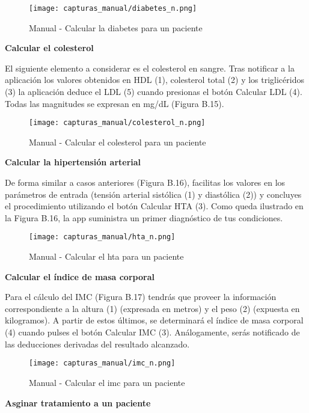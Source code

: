 \documentclass[11pt,spanish,
		listoftables,listoffigures]
		{tfgplantilla}
\begin{document}
\begin{figure}[H]
\centering
\texttt{[image: capturas\_manual/diabetes\_n.png]}
\caption{Manual - Calcular la diabetes para un paciente}
\end{figure}

\textbf {Calcular el colesterol}

El siguiente elemento a considerar es el colesterol en sangre. Tras notificar a la aplicación los valores obtenidos en HDL (1), colesterol total (2) y los triglicéridos (3) la aplicación deduce el LDL (5) cuando presionas el botón \textquotedbl Calcular LDL\textquotedbl{} (4). Todas las magnitudes se expresan en mg/dL (Figura B.15).

\begin{figure}[H]
\centering
\texttt{[image: capturas\_manual/colesterol\_n.png]}
\caption{Manual - Calcular el colesterol para un paciente}
\end{figure}

\textbf {Calcular la hipertensión arterial}

De forma similar a casos anteriores (Figura B.16), facilitas los valores en los parámetros de entrada (tensión arterial sistólica (1) y diastólica (2)) y concluyes el procedimiento utilizando el botón \textquotedbl Calcular HTA\textquotedbl{} (3). Como queda ilustrado en la Figura B.16, la app suministra un primer diagnóstico de tus condiciones.

\begin{figure}[H]
\centering
\texttt{[image: capturas\_manual/hta\_n.png]}
\caption{Manual - Calcular el hta para un paciente}
\end{figure}

\textbf {Calcular el índice de masa corporal}

Para el cálculo del IMC (Figura B.17) tendrás que proveer la información correspondiente a la altura (1) (expresada en metros) y el peso (2) (expuesta en kilogramos). A partir de estos últimos, se determinará el índice de masa corporal (4) cuando pulses el botón \textquotedbl Calcular IMC\textquotedbl{} (3). Análogamente, serás notificado de las deducciones derivadas del resultado alcanzado.

\begin{figure}[H]
\centering
\texttt{[image: capturas\_manual/imc\_n.png]}
\caption{Manual - Calcular el imc para un paciente}
\end{figure}

\textbf {Asginar tratamiento a un paciente}
\end{document}
